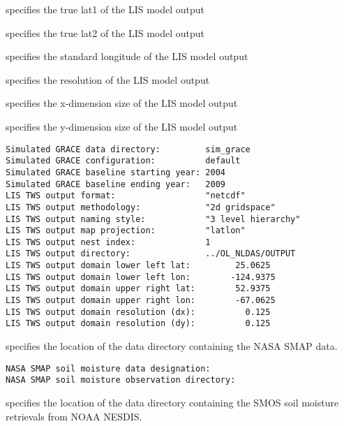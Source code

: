  specifies the true lat1 of the LIS model output

 specifies the true lat2 of the LIS model output

 specifies the standard longitude of the LIS model output

 specifies the resolution of the LIS model output

 specifies the x-dimension size of the LIS model output

 specifies the y-dimension size of the LIS model output

 

 \begin{Verbatim}[frame=single]
Simulated GRACE data directory:         sim_grace
Simulated GRACE configuration:          default
Simulated GRACE baseline starting year: 2004
Simulated GRACE baseline ending year:   2009
LIS TWS output format:                  "netcdf"
LIS TWS output methodology:             "2d gridspace"
LIS TWS output naming style:            "3 level hierarchy"
LIS TWS output map projection:          "latlon"
LIS TWS output nest index:              1
LIS TWS output directory:               ../OL_NLDAS/OUTPUT
LIS TWS output domain lower left lat:         25.0625
LIS TWS output domain lower left lon:        -124.9375
LIS TWS output domain upper right lat:        52.9375
LIS TWS output domain upper right lon:        -67.0625
LIS TWS output domain resolution (dx):          0.125
LIS TWS output domain resolution (dy):          0.125
 \end{Verbatim}

 
  

 specifies the location of the data directory containing the NASA 
 SMAP data.

 

 \begin{Verbatim}[frame=single]
NASA SMAP soil moisture data designation:
NASA SMAP soil moisture observation directory:
 \end{Verbatim}

 
  specifies
 the location of the data directory containing the SMOS soil
 moisture retrievals from NOAA NESDIS.
 

